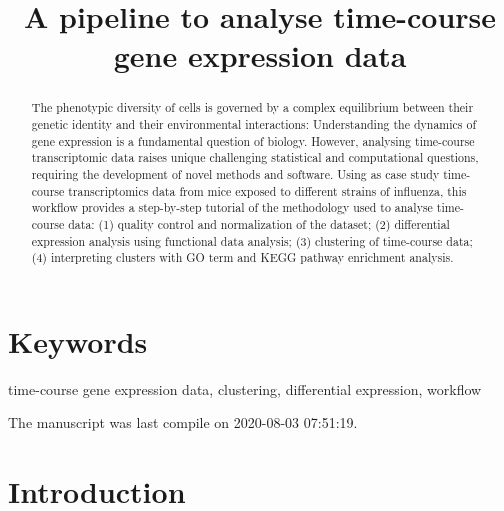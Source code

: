 \documentclass[9pt,a4paper,]{extarticle}
\begin{document}
\pagestyle{front}

\title{A pipeline to analyse time-course gene expression data}


\maketitle
\thispagestyle{front}

\begin{abstract}
The phenotypic diversity of cells is governed by a complex equilibrium between their genetic identity and their environmental interactions: Understanding the dynamics of gene expression is a fundamental question of biology. However, analysing time-course transcriptomic data raises unique challenging statistical and computational questions, requiring the development of novel methods and software. Using as case study time-course transcriptomics data from mice exposed to different strains of influenza, this workflow provides a step-by-step tutorial of the methodology used to analyse time-course data: (1) quality control and normalization of the dataset; (2) differential expression analysis using functional data analysis; (3) clustering of time-course data; (4) interpreting clusters with GO term and KEGG pathway enrichment analysis.
\end{abstract}

\section*{Keywords}
time-course gene expression data, clustering, differential expression, workflow


\clearpage
\pagestyle{main}

The manuscript was last compile on 2020-08-03 07:51:19.

\hypertarget{introduction}{%
\section{Introduction}\label{introduction}}
\end{document}
